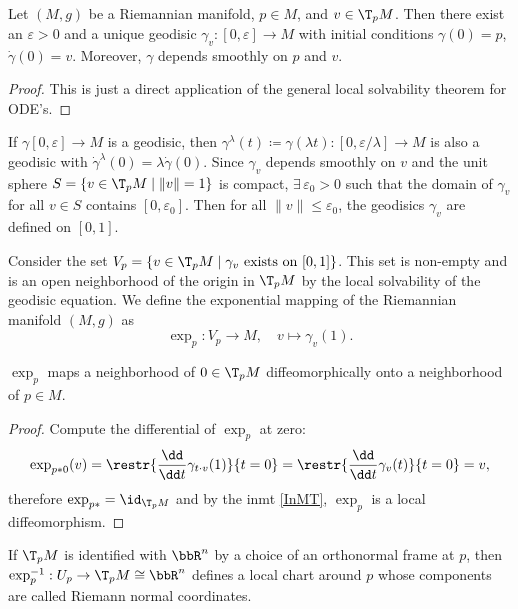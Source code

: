 \begin{lem}
    Let $(M,g)$ be a Riemannian manifold, $p\in M$, and $v\in \T_p M$. Then there exist an $\varepsilon>0$ and a unique geodisic $\gamma_v:[0,\varepsilon]\to M$ with initial conditions $\gamma(0)=p$, $\dot\gamma(0)=v$. Moreover, $\gamma $ depends smoothly on $p$ and $v$.
\end{lem}
\begin{proof}
    This is just a direct application of the general local solvability theorem for ODE's.
\end{proof}
\begin{cor}
    If $\gamma[0,\varepsilon]\to M$ is a geodisic, then $\gamma^\lambda(t)\coloneqq \gamma(\lambda t):[0,\varepsilon/\lambda]\to M$ is also a geodisic with $\dot\gamma^\lambda(0)=\lambda\dot\gamma(0)$. Since $\gamma_v$ depends smoothly on $v$ and the unit sphere $S=\{v\in \T_pM\mid \lVert v\rVert=1\}$ is compact, $\exists\,\varepsilon_0>0$ such that the domain of $\gamma_v$ for all $v\in S$ contains $[0,\varepsilon_0]$. Then for all $\lVert v\rVert\leq \varepsilon_0$, the geodisics $\gamma_v$ are defined on $[0,1]$.
\end{cor}
\begin{defn}
    Consider the set $V_p=\{v\in \T_p M\mid \gamma_v \text{ exists on }[0,1]\}$. This set is non-empty and is an open neighborhood of the origin in $\T_p M$ by the local solvability of the geodisic equation. We define the exponential mapping of the Riemannian manifold $(M,g)$ as
    \[\exp_p :V_p\to M,\quad v\mapsto \gamma_v(1).\]
\end{defn}

\begin{thm}
    $\exp_p$ maps a neighborhood of $0\in \T_pM$ diffeomorphically onto a neighborhood of $p\in M$.
\end{thm}
\begin{proof}
    Compute the differential of $\exp_p$ at zero:
    \[\exp_{p\ast0}(v)=\restr{\frac{\dd}{\dd t}\gamma_{t\cdot v}(1)}{t=0}=\restr{\frac{\dd}{\dd t}\gamma_{v}(t)}{t=0}=v,\]
    therefore $\exp_{p\ast}=\id_{\T_p M}$ and by the \gls{inmt} \ref{InMT}, $\exp_p$ is a local diffeomorphism.
\end{proof}

\begin{defn}
    If $\T_p M$ is identified with $\bbR^n$ by a choice of an orthonormal frame at $p$, then $\exp_p^{-1}:U_p\to \T_p M\cong\bbR^n$ defines a local chart around $p$ whose components are called Riemann normal coordinates.
\end{defn}

